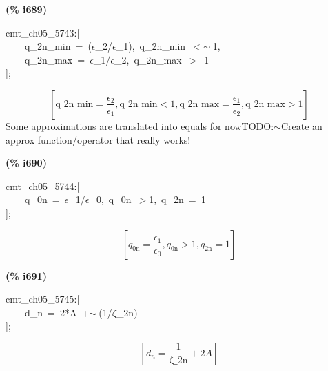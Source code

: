 \documentclass[fleqn]{article}
\begin{document}
\noindent
\begin{minipage}[t]{4.000000em}\color{red}\bfseries
(\% i689)	
\end{minipage}
\begin{minipage}[t]{\textwidth}\color{blue}
cmt\_ch05\_5743:[\\
\ \ \ \ q\_2n\_min\ =\ (\ensuremath{\epsilon}\_2/\ensuremath{\epsilon}\_1),\ q\_2n\_min\ \ensuremath{<}\ensuremath{\sim\ }1,\\
\ \ \ \ q\_2n\_max\ =\ \ensuremath{\epsilon}\_1/\ensuremath{\epsilon}\_2,\ q\_2n\_max\ \ensuremath{>}\ 1\\
];
\end{minipage}
\[\displaystyle \tag{\% o689} 
\left[ \ensuremath{\mathrm{q\_ 2n\_ min}}=\frac{{{\epsilon }_2}}{{{\epsilon }_1}}\operatorname{,}\ensuremath{\mathrm{q\_ 2n\_ min}}\operatorname{<  }1\operatorname{,}\ensuremath{\mathrm{q\_ 2n\_ max}}=\frac{{{\epsilon }_1}}{{{\epsilon }_2}}\operatorname{,}\ensuremath{\mathrm{q\_ 2n\_ max}}\operatorname{>  }1\right] \mbox{}
\]
Some approximations are translated into equals for nowTODO:\ensuremath{\sim }Create an approx function/operator that really works!


\noindent
\begin{minipage}[t]{4.000000em}\color{red}\bfseries
(\% i690)	
\end{minipage}
\begin{minipage}[t]{\textwidth}\color{blue}
cmt\_ch05\_5744:[\\
\ \ \ \ q\_0n\ =\ \ensuremath{\epsilon}\_1/\ensuremath{\epsilon}\_0,\ q\_0n\ \ensuremath{>}1,\ q\_2n\ =\ 1\\
];
\end{minipage}
\[\displaystyle \tag{\% o690} 
\left[ {q_{\ensuremath{\mathrm{0n}}}}=\frac{{{\epsilon }_1}}{{{\epsilon }_0}}\operatorname{,}{q_{\ensuremath{\mathrm{0n}}}}\operatorname{>  }1\operatorname{,}{q_{\ensuremath{\mathrm{2n}}}}=1\right] \mbox{}
\]


\noindent
\begin{minipage}[t]{4.000000em}\color{red}\bfseries
(\% i691)	
\end{minipage}
\begin{minipage}[t]{\textwidth}\color{blue}
cmt\_ch05\_5745:[\\
\ \ \ \ d\_n\ =\ 2*A\ +\ensuremath{\sim\ }(1/\ensuremath{\zeta}\_2n)\\
];
\end{minipage}
\[\displaystyle \tag{\% o691} 
\left[ {d_n}=\frac{1}{\ensuremath{\mathrm{\zeta \_ 2n}}}+2 A\right] \mbox{}
\]
\end{document}
